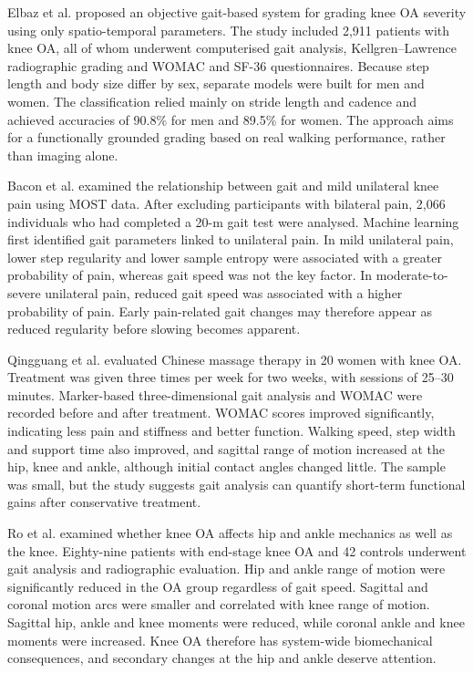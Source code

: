 \documentclass[12pt]{elsarticle}
\begin{document}
Elbaz et al. \cite{elbaz2014novel} proposed an objective gait-based system for grading knee OA severity using only spatio-temporal parameters. { The} study included 2,911 patients with knee OA, all of whom underwent { computerised gait analysis, Kellgren--Lawrence radiographic grading} and WOMAC and { SF-36 questionnaires. Because} step length and body { size differ by sex, separate models were built} for men and women. { The classification relied mainly} on stride length and cadence and achieved accuracies of 90.8\% for { men} and 89.5\% for { women. The approach aims for} a functionally grounded { grading} based on real walking { performance, rather than imaging alone.}

Bacon et al. \cite{bacon2022relation} examined the relationship between gait and mild unilateral knee pain using MOST { data.} After excluding participants with bilateral pain, 2,066 individuals who had completed a 20-m gait { test were analysed.} Machine learning first { identified} gait parameters linked to unilateral pain. { In} mild unilateral pain, lower step regularity and lower sample entropy were associated with { a} greater probability of pain, whereas gait speed was not the key factor. In moderate-to-severe unilateral pain, reduced gait speed was associated with { a higher probability of pain. Early pain-related gait changes may therefore appear as} reduced regularity before slowing becomes apparent.

{ Qingguang et al. \cite{qingguang2015gait} evaluated Chinese massage therapy in 20 women with knee OA. Treatment was given three times per week for two weeks, with sessions of 25--30 minutes. Marker-based three-dimensional gait analysis and WOMAC were recorded before and after treatment. WOMAC scores improved significantly, indicating less pain and stiffness and better function. Walking speed, step width and support time also improved, and sagittal range of motion increased at the hip, knee and ankle, although initial contact angles changed little. The sample was small, but the study suggests gait analysis can quantify short-term functional gains after conservative treatment.}

Ro et al. \cite{ro2019effects} examined whether knee OA affects hip and ankle { mechanics as well as the knee. Eighty-nine} patients with end-stage knee OA and 42 { controls} underwent gait analysis and radiographic evaluation. { Hip} and ankle range of motion { were} significantly reduced in the OA { group} regardless of gait speed. { Sagittal} and coronal motion arcs were { smaller} and correlated with knee range of motion. { Sagittal hip, ankle} and knee moments were { reduced,} while coronal ankle and knee moments were increased. { Knee OA therefore} has system-wide biomechanical consequences, and secondary changes at the hip and { ankle deserve attention.}
\end{document}
